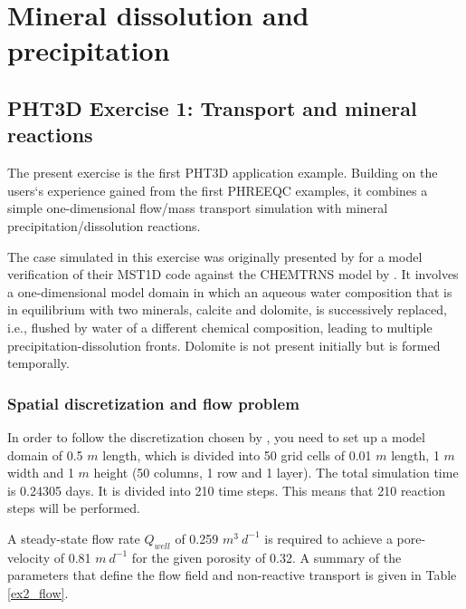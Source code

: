 \chapter[Mineral dissolution and precipitation]{Mineral dissolution and precipitation}
\def\shorttitle{Mineral dissolution and precipitation} 

\section[PHT3D Exercise 1: Transport and mineral reactions]{PHT3D Exercise 1: Transport and mineral reactions}

The present exercise is the first PHT3D application example. 
Building on the users`s experience gained from the first PHREEQC examples, 
it combines a simple one-dimensional flow/mass transport simulation with
mineral precipitation/dissolution reactions.

The case simulated in this exercise was originally presented by
\cite{enges92} for a model verification of their MST1D code
against the CHEMTRNS model by \cite{noor87}. It involves a
one-dimensional model domain in which an aqueous water composition
that is in equilibrium with two minerals, calcite and dolomite, is
successively replaced, i.e., flushed by water of a different
chemical composition, leading to multiple
precipitation-dissolution fronts. Dolomite is not present
initially but is formed temporally.

\subsection[Spatial discretization and flow problem]{Spatial discretization and flow problem}

In order to follow the discretization chosen by \cite{enges92}, 
you need to set up a model domain
of 0.5 $m$ length, which is divided into 50 grid cells of 0.01 $m$
length, 1 $m$ width and 1 $m$ height (50 columns, 1 row and 1
layer). The total simulation time is 0.24305 days. It is divided
into 210 time steps. This means that 210 reaction steps will be performed. 

A steady-state flow rate $Q_{well}$ of 0.259
$m^3\ d^{-1}$ is required to achieve a pore-velocity of 0.81 $m\
d^{-1}$ for the given porosity of 0.32. A summary of the
parameters that define the flow field and non-reactive transport
is given in Table \ref{ex2_flow}.

